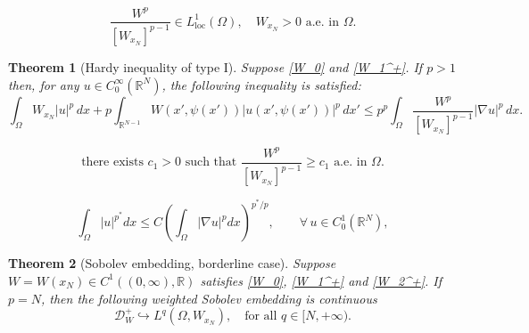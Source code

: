 \documentclass[10pt,a4paper]{amsart}
\newtheorem{theorem}{Theorem}
\newcommand{\dint}{\int_{\Omega}}
\begin{document}
\begin{equation}\label{W_1^+}\tag{$W_1^+$}
\frac{W^p}{[W_{x_N}]^{p-1}} \in L^1_{\mathrm{loc}}(\Omega) ,\quad W_{x_N} > 0 
\text{ a.e. in } \Omega.\end{equation} 

\begin{theorem}[Hardy inequality of type I] 
\label{Hardy-Grafico}
Suppose \eqref{W_0} and \eqref{W_1^+}. If $p>1$ then,  for any $u \in C_0^\infty(\mathbb{R}^N)$, the following inequality is satisfied:
\begin{equation}\label{Hardy-Geral-Grafico}
\int_{\Omega} W_{x_N} |u|^p \, dx 
+ p \int_{\mathbb{R}^{N-1}} W(x',\psi(x')) |u(x',\psi(x'))|^p \, dx' 
\leq p^p \int_{\Omega} \frac{W^p}{[W_{x_N}]^{p-1}} |\nabla u|^p \, dx.
\end{equation}
\end{theorem}

   \begin{equation} \label{W_2^+} \tag{$W_2^+$}
     \text{there exists } c_1>0 \text{ such that } \frac{W^p}{[W_{x_N}]^{p-1}} 
     \geq c_1 \text { a.e. in } \Omega.
    \end{equation} 

  \begin{equation}\label{GNS-Grafico}
    \dint |u|^{p^*} dx \leq C \left( \dint |\nabla u|^p dx \right)^{p^*/p}, \qquad 
    \forall\,u \in C_0^1(\mathbb{R}^N),
    \end{equation}

	\begin{theorem}[Sobolev embedding, borderline case]\label{Sobolev p=N} Suppose 
     $W=W(x_N)\in C^1((0,\infty),\mathbb{R})$ satisfies \eqref{W_0}, \eqref{W_1^+} 
     and \eqref{W_2^+}. If $p=N$, then the following weighted Sobolev embedding is continuous
    $$
    \mathcal{D}_W^+ \hookrightarrow L^q(\Omega,W_{x_N}),  \quad \text{for all } 
    q \in [N,+\infty).
    $$
    \end{theorem}
\end{document}
